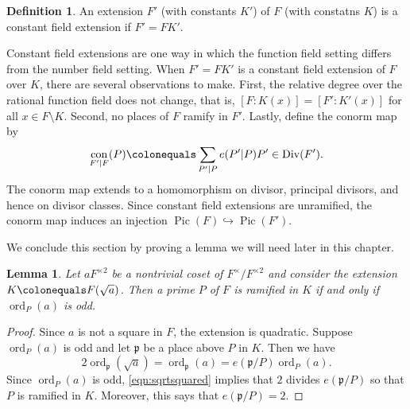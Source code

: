 \documentclass{dcthesis}
\newcommand{\defi}[1]{\textsf{#1}}
\DeclareMathOperator{\con}{con}
\DeclareMathOperator{\Div}{Div}
\DeclareMathOperator{\Pic}{Pic}
\DeclareMathOperator{\ord}{ord}
\numberwithin{equation}{section}
\newtheorem{lemma}[equation]{Lemma}
\theoremstyle{definition}
\newtheorem{definition}[equation]{Definition}
\theoremstyle{remark}
\begin{document}
{{{    \begin{definition}
      \label{def:constantfieldextension}
      An extension $F'$ (with constants $K'$)
      of $F$ (with constatns $K$)
      is a \defi{constant field extension}
      if $F'= FK'$.
    \end{definition}
    Constant field extensions are one way in
    which the function field setting differs
    from the number field setting.
    When $F'=FK'$ is a constant field extension
    of $F$ over $K$, there are
    several observations to make.
    First, the relative degree over
    the rational function field does not change,
    that is,
    $[F:K(x)] = [F':K'(x)]$ for
    all $x\in F\setminus K$.
    Second,
    no places of $F$ ramify in $F'$.
    Lastly,
    define the \defi{conorm map} by
    \begin{equation}
      \label{eqn:conorm}
      \con_{F'|F}(P)
      \colonequals\sum_{P'|P}e(P'|P)P'\in\Div(F').
    \end{equation}
    The conorm map extends to a homomorphism
    on divisor, principal divisors,
    and hence on divisor classes.
    Since constant field extensions
    are unramified,
    the conorm map
    induces an injection
    $\Pic(F)\hookrightarrow\Pic(F')$.
    \par
    We conclude this section by proving a
    lemma we will need later in this chapter.
    \begin{lemma}
      \label{lem:kummerramification}
      Let $aF^{\times 2}$ be a nontrivial
      coset of $F^\times/F^{\times 2}$
      and consider the extension
      $K\colonequals F(\sqrt{a})$.
      Then a prime $P$ of $F$ is ramified
      in $K$ if and only if
      $\ord_P(a)$ is odd.
    \end{lemma}
    \begin{proof}
      Since $a$ is not a square in $F$,
      the extension is quadratic.
      Suppose $\ord_P(a)$ is odd
      and let $\mathfrak{p}$ be
      a place above $P$ in $K$.
      Then we have
      \begin{equation}
        \label{eqn:sqrtsquared}
        2\ord_{\mathfrak{p}}(\sqrt{a})
        = \ord_{\mathfrak{p}}(a)
        = e(\mathfrak{p}/P)\ord_P(a).
      \end{equation}
      Since $\ord_P(a)$ is odd,
      \eqref{eqn:sqrtsquared}
      implies that $2$ divides
      $e(\mathfrak{p}/P)$ so that
      $P$ is ramified in $K$.
      Moreover, this says that
      $e(\mathfrak{p}/P) = 2$.
      \par

\end{proof}}}}
\end{document}
